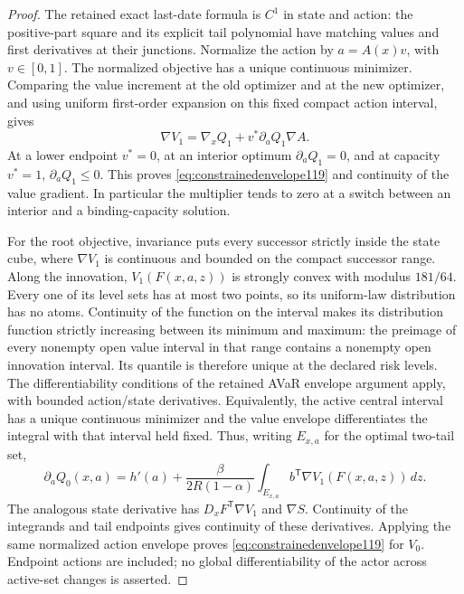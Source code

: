 \begin{proof}
The retained exact last-date formula is $C^1$ in state and action:
the positive-part square and its explicit tail polynomial have matching
values and first derivatives at their junctions.  Normalize the action
by $a=A(x)v$, with $v\in[0,1]$.  The normalized objective has
a unique continuous minimizer.  Comparing the value increment at the
old optimizer and at the new optimizer, and using uniform first-order
expansion on this fixed compact action interval, gives
\[
 \nabla V_1=\nabla_xQ_1+v^*\partial_aQ_1\nabla A.
\]
At a lower endpoint $v^*=0$, at an interior optimum
$\partial_aQ_1=0$, and at capacity
$v^*=1$, $\partial_aQ_1\le0$.  This proves
\eqref{eq:constrainedenvelope119} and continuity of the value
gradient.  In particular the multiplier tends to zero at a switch
between an interior and a binding-capacity solution.

For the root objective, invariance puts every successor strictly
inside the state cube, where $\nabla V_1$ is continuous and
bounded on the compact successor range.  Along the innovation,
$V_1(F(x,a,z))$ is strongly convex with modulus $181/64$.
Every one of its level sets has at most two points, so its
uniform-law distribution has no atoms.  Continuity of the function
on the interval makes its distribution function strictly increasing
between its minimum and maximum: the preimage of every nonempty
open value interval in that range contains a nonempty open innovation
interval.  Its quantile is therefore unique at the declared risk
levels.  The differentiability conditions of the retained AVaR
envelope argument apply, with bounded action/state derivatives.
Equivalently, the active central interval has a unique continuous
minimizer and the value envelope differentiates the integral with
that interval held fixed.  Thus, writing $E_{x,a}$ for the optimal
two-tail set,
\[
 \partial_aQ_0(x,a)=h'(a)+
 \frac{\beta}{2R(1-\alpha)}
       \int_{E_{x,a}} b^{\mathsf T}\nabla V_1(F(x,a,z))\,dz.
\]
The analogous state derivative has $D_xF^{\mathsf T}\nabla V_1$
and $\nabla S$.  Continuity of the integrands and tail endpoints
gives continuity of these derivatives.  Applying the same normalized
action envelope proves \eqref{eq:constrainedenvelope119} for
$V_0$.  Endpoint actions are included; no global differentiability
of the actor across active-set changes is asserted.
\end{proof}

